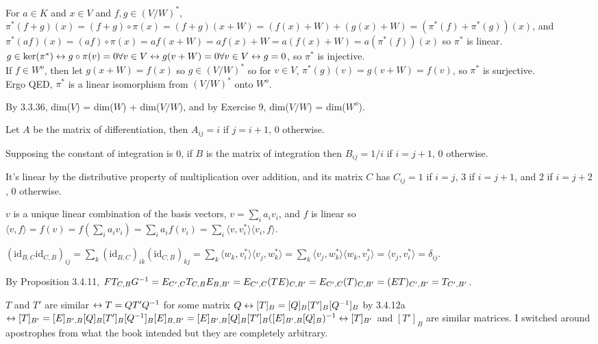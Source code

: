 \documentclass[11pt, oneside]{article}   	%
\begin{document}
\item For $a \in K$ and $x\in V$ and $f, g \in (V/W)^*$, $\pi^*(f + g)(x) = (f + g)\circ \pi(x) = (f + g)(x + W) = (f(x) + W) + (g(x) + W) = (\pi^*(f)+ \pi^*(g))(x)$, and $\pi^*(af)(x) = (af) \circ \pi(x) = af(x + W) = af(x) + W = a(f(x) + W) = a(\pi^*(f))(x)$ so $\pi^*$ is linear. \\
$g \in \ker(\pi^*) \leftrightarrow g \circ \pi(v) = 0 \forall v \in V \leftrightarrow g(v + W) = 0 \forall v \in V \leftrightarrow g = 0$, so $\pi^*$ is injective. \\
If $f \in W^o$, then let $g(x + W) = f(x)$ so $g \in (V/W)^*$ so for $v \in V$, $\pi^*(g)(v) = g(v + W)  = f(v)$, so $\pi^*$ is surjective. \\
Ergo QED, $\pi^*$ is a linear isomorphism from $(V/W)^*$ onto $W^o$.
\item By 3.3.36, dim($V$) = dim($W$) + dim($V/W$), and by Exercise 9, dim($V/W$) = dim($W^o$).
\item \be
\item Let $A$ be the matrix of differentiation, then $A_{ij} = i$ if $j = i + 1$, 0 otherwise.
\item Supposing the constant of integration is 0, if $B$ is the matrix of integration then $B_{ij} = 1/i$ if $i = j + 1$, 0 otherwise.
\item It's linear by the distributive property of multiplication over addition, and its matrix $C$ has $C_{ij} = 1$ if $i = j$, 3 if $i = j + 1$, and 2 if $i = j + 2$, 0 otherwise.
\ee
\item $v$ is a unique linear combination of the basis vectors, $v = \sum_i a_i v_i$, and $f$ is linear so $\langle v, f\rangle = f(v) = f(\sum_ia_iv_i) = \sum_ia_if(v_i) = \sum_i \langle v, v_i^* \rangle\langle v_i, f \rangle$.
\item $(\text{id}_{B,C}\text{id}_{C, B})_{ij} = \sum_k(\text{id}_{B,C})_{ik}(\text{id}_{C, B})_{kj} = \sum_k\langle w_k, v_i^*\rangle\langle v_j, w_k^*\rangle = \sum_k \langle v_j, w_k^*\rangle\langle w_k, v_j^*\rangle = \langle v_j, v_i^*\rangle = \delta_{ij}$.
\item By Proposition 3.4.11, $FT_{C, B}G^{-1} = E_{C', C}T_{C, B}E_{B, B'} = E_{C', C}(TE)_{C, B'} = E_{C', C}(T)_{C, B'} = (ET)_{C', B'} = T_{C', B'}$.
\item $T$ and $T'$ are similar $\leftrightarrow T = QT'Q^{-1}$ for some matrix $Q \leftrightarrow [T]_B = [Q]_B[T']_B[Q^{-1}]_B$ by 3.4.12a $ \leftrightarrow [T]_{B'} = [E]_{B', B}[Q]_B[T']_B[Q^{-1}]_B[E]_{B, B'}  = [E]_{B', B}[Q]_B[T']_B([E]_{B', B}[Q]_B)^{-1}\leftrightarrow [T]_{B'}$ and $[T']_B$ are similar matrices. I switched around apostrophes from what the book intended but they are completely arbitrary.
\end{document}
